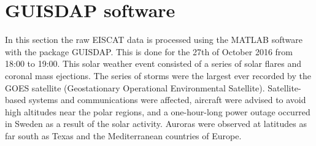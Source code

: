 
\section{GUISDAP software}
In this section the raw EISCAT data is processed using the MATLAB software with the package GUISDAP. This is done for the 27th of October 2016 from 18:00 to 19:00. This solar weather event consisted of a series of solar flares and coronal mass ejections. The series of storms were the largest ever recorded by the GOES satellite (Geostationary Operational Environmental Satellite). Satellite-based systems and communications were affected, aircraft were advised to avoid high altitudes near the polar regions, and a one-hour-long power outage occurred in Sweden as a result of the solar activity. Auroras were observed at latitudes as far south as Texas and the Mediterranean countries of Europe.